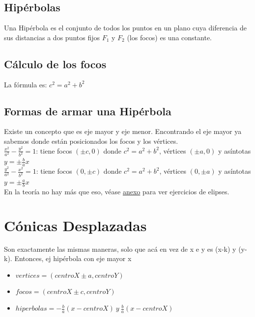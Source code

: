 \documentclass[10pt,a4paper]{article}
\begin{document}
\subsection*{Hipérbolas}
Una Hipérbola es el conjunto de todos los puntos en un plano cuya diferencia de sus distancias a dos puntos fijos $F_{1}$ y $F_{2}$ (los focos) es una constante. 
\subsection*{Cálculo de los focos}
La fórmula es: $c^{2} = a^{2} + b^{2}$
\subsection*{Formas de armar una Hipérbola}
Existe un concepto que es eje mayor y eje menor. Encontrando el eje mayor ya sabemos donde están posicionados los focos y los vértices. \\
$\frac{x^{2}}{a^{2}} - \frac{y^{2}}{b^{2}} = 1$: tiene focos $(\pm c, 0)$ donde $c^{2} = a^{2} + b^{2}$, vértices $(\pm a, 0)$ y asíntotas $y = \pm \frac{b}{a}x$ \\
$\frac{y^{2}}{a^{2}} - \frac{x^{2}}{b^{2}} = 1$: tiene focos $(0,  \pm c)$ donde $c^{2} = a^{2} + b^{2}$, vértices $(0, \pm a)$ y asíntotas $y = \pm \frac{a}{b}x$ \\
En la teoría no hay más que eso, véase \hyperref[subsec:hiperbolas_ejercicios]{anexo} para ver ejercicios de elipses. 
\section*{Cónicas Desplazadas}
Son exactamente las mismas maneras, solo que acá en vez de x e y es (x-k) y (y-k).
Entonces, ej hipérbola con eje mayor x
\begin{itemize}
    \item $vertices = (centroX \pm a, centroY)$
    \item $focos = (centroX \pm c, centroY)$
    \item $hiperbolas = -\frac{b}{a}(x - centroX) \ y \ \frac{b}{a}(x - centroX) $
\end{itemize}
\end{document}
